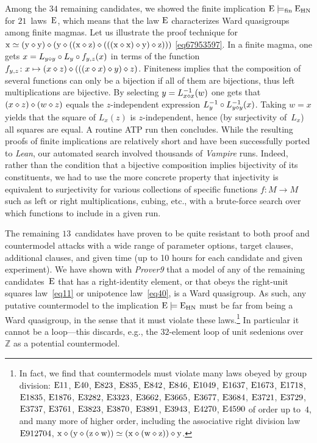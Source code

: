 Among the $34$ remaining candidates, we showed the finite implication $\mathrm{E}\models_{\mathrm{fin}}\mathrm{E}_{\mathrm{HN}}$ for $21$~laws~$\mathrm{E}$, which means that the law $\mathrm{E}$ characterizes Ward quasigroups among finite magmas.  Let us illustrate the proof technique for $\mathrm{x} \simeq (\mathrm{y} \diamond \mathrm{y}) \diamond (\mathrm{y} \diamond ((\mathrm{x} \diamond \mathrm{z}) \diamond (((\mathrm{x} \diamond \mathrm{x}) \diamond \mathrm{y}) \diamond \mathrm{z})))$ \eqref{eq67953597}.  In a finite magma, one gets $x = L_{y\diamond y} \circ L_y \circ f_{y,z}(x)$ in terms of the function $f_{y,z}\colon x \mapsto (x\diamond z) \diamond (((x \diamond x) \diamond y) \diamond z)$.  Finiteness implies that the composition of several functions can only be a bijection if all of them are bijections, thus left multiplications are bijective.  By selecting $y=L_{x\diamond x}^{-1}(w)$ one gets that $(x\diamond z)\diamond (w\diamond z)$ equals the $z$-independent expression $L_y^{-1} \circ L_{y\diamond y}^{-1}(x)$.  Taking $w=x$ yields that the square of $L_x(z)$ is $z$-independent, hence (by surjectivity of~$L_x$) all squares are equal.  A routine ATP run then concludes.
While the resulting proofs of finite implications are relatively short and have been successfully ported to \emph{Lean}, our automated search involved thousands of \emph{Vampire} runs.
Indeed, rather than the condition that a bijective composition implies bijectivity of its constituents, we had to use the more concrete property that injectivity is equivalent to surjectivity for various collections of specific functions $f\colon M\to M$ such as left or right multiplications, cubing, etc.\@, with a brute-force search over which functions to include in a given run.

The remaining $13$~candidates have proven to be quite resistant to both proof and countermodel attacks with a wide range of parameter options, target clauses, additional clauses, and given time (up to 10 hours for each candidate and given experiment).  We have shown with \emph{Prover9} that a model of any of the remaining candidates~$\mathrm{E}$ that has a right-identity element, or that obeys the right-unit squares law~\eqref{eq11} or unipotence law~\eqref{eq40}, is a Ward quasigroup.  As such, any putative countermodel to the implication $\mathrm{E}\models\mathrm{E}_{\mathrm{HN}}$ must be far from being a Ward quasigroup, in the sense that it must violate these laws.\footnote{In fact, we find that countermodels must violate many laws obeyed by group division: $\mathrm{E}11$, $\mathrm{E}40$, $\mathrm{E}823$, $\mathrm{E}835$, $\mathrm{E}842$, $\mathrm{E}846$, $\mathrm{E}1049$, $\mathrm{E}1637$, $\mathrm{E}1673$, $\mathrm{E}1718$, $\mathrm{E}1835$, $\mathrm{E}1876$, $\mathrm{E}3282$, $\mathrm{E}3323$, $\mathrm{E}3662$, $\mathrm{E}3665$, $\mathrm{E}3677$, $\mathrm{E}3684$, $\mathrm{E}3721$, $\mathrm{E}3729$, $\mathrm{E}3737$, $\mathrm{E}3761$, $\mathrm{E}3823$, $\mathrm{E}3870$, $\mathrm{E}3891$, $\mathrm{E}3943$, $\mathrm{E}4270$, $\mathrm{E}4590$ of order up to~$4$, and many more of higher order, including the associative right division law $\mathrm{E}912704$, $\mathrm{x}\diamond(\mathrm{y}\diamond(\mathrm{z}\diamond\mathrm{w})) \simeq(\mathrm{x}\diamond(\mathrm{w}\diamond\mathrm{z}))\diamond\mathrm{y}$.}  In particular it cannot be a loop---this discards, e.g., the $32$-element loop of unit sedenions over~$\mathbb{Z}$ as a potential countermodel.

